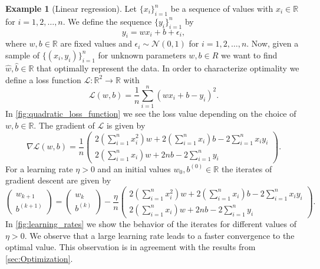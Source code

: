 \documentclass[12pt]{article}
\theoremstyle{definition}
\newtheorem{example}[example]{Example}
\numberwithin{equation}{section}
\newcommand{\R}{\mathbb{R}}
\newcommand{\CL}{\mathcal{L}}
\newcommand{\CN}{\mathcal{N}}
\begin{document}
\begin{example}[Linear regression]
  \label{ex:linear_regression}
  Let $\{x_i\}_{i=1}^n$ be a sequence of values with $x_i \in \R$ for $i = 1,2,\dots,n$. We define the sequence $\{y_i\}_{i=1}^n$ by
  \begin{equation*}
    y_i = wx_i + b + \epsilon_i,
  \end{equation*}
  where $w,b \in \R$ are fixed values and $\epsilon_i \sim \CN(0,1)$ for $i = 1, 2, \dots, n$.
  Now, given a sample of $\{(x_i, y_i)\}_{i=1}^n$ for unknown parameters $w, b \in R$ we want to find $\hat{w}, \hat{b} \in \R$ that optimally represent the data. In order to characterize optimality we define a loss function $\CL : \R^2 \rightarrow \R$ with 
  \begin{equation}
    \CL (w, b) = \frac{1}{n} \sum_{i=1}^n(wx_i + b - y_i)^2.
  \end{equation}
  In \autoref{fig:quadratic_loss_function} we see the loss value depending on the choice of $w,b \in \R$. The gradient of $\CL$ is given by
  \[
    \nabla \CL (w,b) = \frac{1}{n}
    \begin{pmatrix}
      2\left(\displaystyle\sum_{i=1}^n x_i^2\right)w + 2 \left(\displaystyle\sum_{i=1}^n x_i\right)b - 2 \displaystyle\sum_{i=1}^n x_i y_i \\
      2 \left(\displaystyle\sum_{i=1}^n x_i\right) w + 2nb - 2 \displaystyle\sum_{i=1}^n y_i
    \end{pmatrix}.
  \]
  For a learning rate $\eta > 0$ and an initial values $w_{0},b^{(0)} \in \R$ the iterates of gradient descent are given by
  \begin{equation}
    \begin{pmatrix}
      w_{k+1} \\
      b^{(k+1)}
    \end{pmatrix}
    =
    \begin{pmatrix}
      w_{k} \\
      b^{(k)}
    \end{pmatrix}
    - \frac{\eta}{n}
    \begin{pmatrix}
      2\left(\displaystyle\sum_{i=1}^n x_i^2\right)w + 2 \left(\displaystyle\sum_{i=1}^n x_i\right)b - 2 \displaystyle\sum_{i=1}^n x_i y_i \\
      2 \left(\displaystyle\sum_{i=1}^n x_i\right) w + 2nb - 2 \displaystyle\sum_{i=1}^n y_i
    \end{pmatrix}.
  \end{equation}
  In \autoref{fig:learning_rates} we show the behavior of the iterates for different values of $\eta >0$. We observe that a large learning rate leads to a faster convergence to the optimal value. This observation is in agreement with the results from \autoref{sec:Optimization}.


\end{example}
\end{document}
